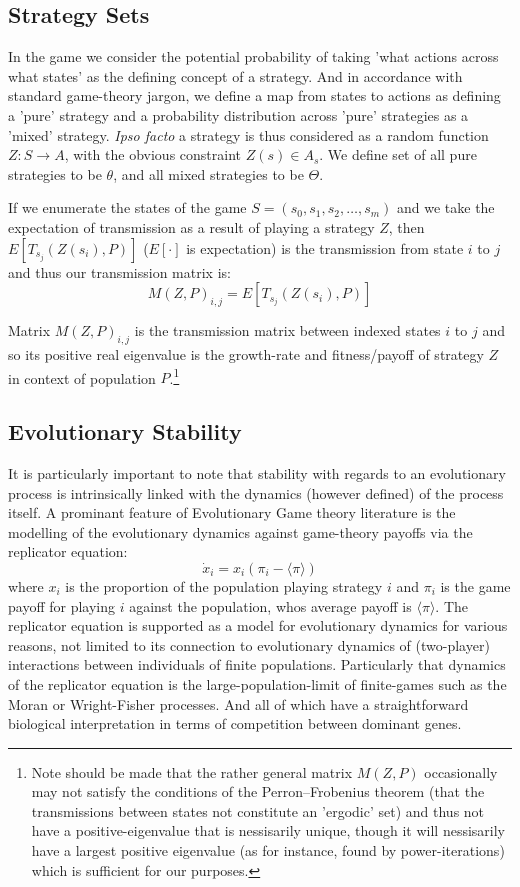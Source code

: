 \documentclass[journal,article,accept,oneauthors,pdftex,10pt,a4paper]{mdpi}
\begin{document}
\subsection{Strategy Sets}

In the game we consider the potential probability of taking 'what actions across what states' as the defining concept of a strategy.
And in accordance with standard game-theory jargon, we define a map from states to actions as defining a 'pure' strategy and a probability distribution across 'pure' strategies as a 'mixed' strategy.
\textit{Ipso facto} a strategy is thus considered as a random function $Z: S \rightarrow A$, with the obvious constraint $Z(s)\in A_s$. We define set of all pure strategies to be $\theta$, and all mixed strategies to be $\Theta$.

If we enumerate the states of the game $S=(s_0,s_1,s_2,\dots,s_m)$ and we take the expectation of transmission as a result of playing a strategy $Z$, then $E[T_{s_j}(Z(s_i),P)]$ ($E[\cdot]$ is expectation) is the transmission from state $i$ to $j$ and thus our transmission matrix is:
$$M(Z,P)_{i,j}=E[T_{s_j}(Z(s_i),P)]$$

Matrix $M(Z,P)_{i,j}$ is the transmission matrix between indexed states $i$ to $j$ and so its positive real eigenvalue is the growth-rate and fitness/payoff of strategy $Z$ in context of population $P$.\footnote{Note should be made that the rather general matrix $M(Z,P)$ occasionally may not satisfy the conditions of the Perron–Frobenius theorem (that the transmissions between states not constitute an 'ergodic' set) and thus not have a positive-eigenvalue that is nessisarily unique, though it will nessisarily have a largest positive eigenvalue (as for instance, found by power-iterations) which is sufficient for our purposes.}

\subsection{Evolutionary Stability}

It is particularly important to note that stability with regards to an evolutionary process is intrinsically linked with the dynamics (however defined) of the process itself.
A prominant feature of Evolutionary Game theory literature is the modelling of the evolutionary dynamics against game-theory payoffs via the replicator equation:
$$ \dot{x}_i = x_i ( \pi_i - \langle\pi\rangle)$$
where $x_i$ is the proportion of the population playing strategy $i$ and $\pi_i$ is the game payoff for playing $i$ against the population, whos average payoff is $\langle\pi\rangle$.
The replicator equation is supported as a model for evolutionary dynamics for various reasons, not limited to its connection to evolutionary dynamics of (two-player) interactions between individuals of finite populations.
Particularly that dynamics of the replicator equation is the large-population-limit of finite-games such as the Moran or Wright-Fisher processes.\cite{stochastic1}\cite{stochastic2} And all of which have a straightforward biological interpretation in terms of competition between dominant genes\cite{replicator1}.
\end{document}
